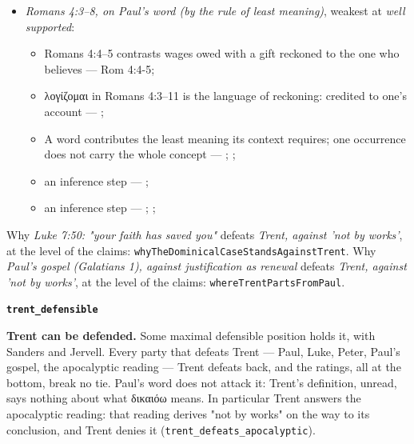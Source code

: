 \documentclass[11pt]{article}
\begin{document}
\begin{itemize}
\begin{itemize}
\end{itemize}
\item \emph{Romans 4:3–8, on Paul's word (by the rule of least meaning)}, weakest at \emph{well supported}:
\begin{itemize}
\item Romans 4:4–5 contrasts wages owed with a gift reckoned to the one who believes --- Rom 4:4-5; \cite[III.xi.18]{calvin-institutes-1960}
\item λογίζομαι in Romans 4:3–11 is the language of reckoning: credited to one's account --- \cite[s.v. λογίζομαι]{bauer-danker-lexicon-2000}; \cite[ad loc. Rom 4:3]{moo-romans-1996}
\item A word contributes the least meaning its context requires; one occurrence does not carry the whole concept --- \cite{silva-biblical-words-1994}; \cite{joos-semantic-axiom-1972}; \cite{barr-semantics-2004}
\item an inference step --- \cite[ad loc. Rom 4:6]{moo-romans-1996}; \cite[s.v. λογίζομαι]{bauer-danker-lexicon-2000}
\item an inference step --- \cite{silva-biblical-words-1994}; \cite[p. 80]{moo-romans-1996}; \cite{barr-semantics-2004}
\end{itemize}
\end{itemize}
\noindent Why \emph{Luke 7:50: "your faith has saved you"} defeats \emph{Trent, against 'not by works'}, at the level of the claims: \texttt{why\allowbreak{}The\allowbreak{}Dominical\allowbreak{}Case\allowbreak{}Stands\allowbreak{}Against\allowbreak{}Trent}.
\noindent Why \emph{Paul's gospel (Galatians 1), against justification as renewal} defeats \emph{Trent, against 'not by works'}, at the level of the claims: \texttt{where\allowbreak{}Trent\allowbreak{}Parts\allowbreak{}From\allowbreak{}Paul}.
\par\medskip\noindent\textbf{\texttt{trent\_\allowbreak{}defensible}}\par\nobreak\noindent
\textbf{Trent can be defended.} Some maximal defensible position holds it, with Sanders and Jervell. Every party that defeats Trent — Paul, Luke, Peter, Paul's gospel, the apocalyptic reading — Trent defeats back, and the ratings, all at the bottom, break no tie. Paul's word does not attack it: Trent's definition, unread, says nothing about what δικαιόω means. In particular Trent answers the apocalyptic reading: that reading derives "not by works" on the way to its conclusion, and Trent denies it (\texttt{trent\_\allowbreak{}defeats\_\allowbreak{}apocalyptic}).
\end{document}
